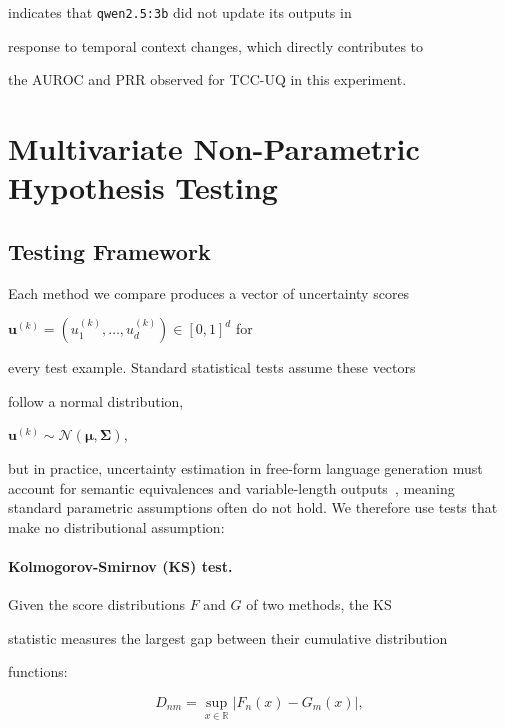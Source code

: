 \documentclass[10pt,twoside]{article}
\numberwithin{equation}{section}
\begin{document}
indicates that \texttt{qwen2.5:3b} did not update its outputs in

response to temporal context changes, which directly contributes to

the AUROC and PRR observed for TCC-UQ in this experiment.




\section{Multivariate Non-Parametric Hypothesis Testing}




\subsection{Testing Framework}



Each method we compare produces a vector of uncertainty scores

$\mathbf{u}^{(k)} = (u_1^{(k)},\ldots,u_d^{(k)}) \in [0,1]^d$ for

every test example. Standard statistical tests assume these vectors

follow a normal distribution,

$\mathbf{u}^{(k)} \sim \mathcal{N}(\boldsymbol{\mu},\boldsymbol{\Sigma})$,

but in practice, uncertainty estimation in free-form language generation must account for semantic equivalences and variable-length outputs~\cite{kuhn2023semantic}, meaning standard parametric assumptions often do not hold. We therefore use tests that make no distributional assumption:



\paragraph{Kolmogorov-Smirnov (KS) test.}

Given the score distributions $F$ and $G$ of two methods, the KS

statistic measures the largest gap between their cumulative distribution

functions:

\begin{equation}

  D_{nm} = \sup_{x\in\mathbb{R}}\bigl|F_n(x)-G_m(x)\bigr|,

\end{equation}
\end{document}
